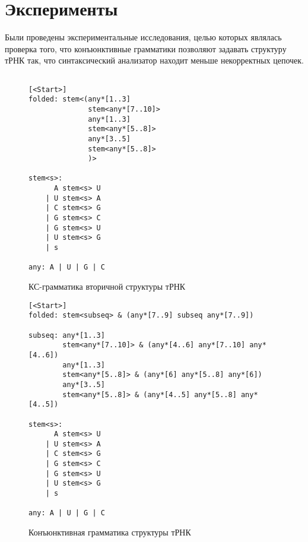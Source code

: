 \section{Эксперименты}

Были проведены экспериментальные исследования, целью которых являлась проверка того, что конъюнктивные грамматики позволяют задавать структуру тРНК так, что синтаксический анализатор находит меньше некорректных цепочек.

\begin{figure}[h]
\begin{center}
\begin{verbatim}

[<Start>]
folded: stem<(any*[1..3] 
              stem<any*[7..10]> 
              any*[1..3] 
              stem<any*[5..8]> 
              any*[3..5] 
              stem<any*[5..8]>
              )>

stem<s>: 
      A stem<s> U
    | U stem<s> A
    | C stem<s> G
    | G stem<s> C
    | G stem<s> U
    | U stem<s> G
    | s

any: A | U | G | C

\end{verbatim}
\caption{КС-грамматика вторичной структуры тРНК}
\label{TRNAgrammar}
\end{center}
\end{figure}

\begin{figure}
\begin{center}
\begin{verbatim}
[<Start>]
folded: stem<subseq> & (any*[7..9] subseq any*[7..9])

subseq: any*[1..3] 
        stem<any*[7..10]> & (any*[4..6] any*[7..10] any*[4..6])
        any*[1..3] 
        stem<any*[5..8]> & (any*[6] any*[5..8] any*[6])
        any*[3..5] 
        stem<any*[5..8]> & (any*[4..5] any*[5..8] any*[4..5])
        
stem<s>:
      A stem<s> U
    | U stem<s> A
    | C stem<s> G
    | G stem<s> C
    | G stem<s> U
    | U stem<s> G
    | s

any: A | U | G | C

\end{verbatim}
\caption{Конъюнктивная грамматика структуры тРНК}
\label{TRNAgrammarConj}
\end{center}
\end{figure}


